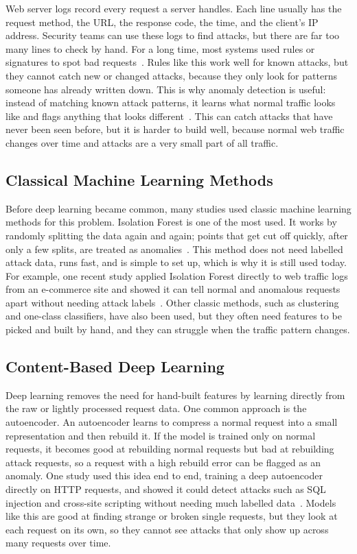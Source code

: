 \documentclass[futureinternet,article,accept,moreauthors]{Definitions/mdpi}
\begin{document}
Web server logs record every request a server handles. Each line usually has the request method, the URL, the response code, the time, and the client's IP address. Security teams can use these logs to find attacks, but there are far too many lines to check by hand. For a long time, most systems used rules or signatures to spot bad requests~\cite{scarfone2007}. Rules like this work well for known attacks, but they cannot catch new or changed attacks, because they only look for patterns someone has already written down. This is why anomaly detection is useful: instead of matching known attack patterns, it learns what normal traffic looks like and flags anything that looks different~\cite{chandola2009}. This can catch attacks that have never been seen before, but it is harder to build well, because normal web traffic changes over time and attacks are a very small part of all traffic.

\subsection{Classical Machine Learning Methods}

Before deep learning became common, many studies used classic machine learning methods for this problem. Isolation Forest is one of the most used. It works by randomly splitting the data again and again; points that get cut off quickly, after only a few splits, are treated as anomalies~\cite{liu2008}. This method does not need labelled attack data, runs fast, and is simple to set up, which is why it is still used today. For example, one recent study applied Isolation Forest directly to web traffic logs from an e-commerce site and showed it can tell normal and anomalous requests apart without needing attack labels~\cite{chua2024}. Other classic methods, such as clustering and one-class classifiers, have also been used, but they often need features to be picked and built by hand, and they can struggle when the traffic pattern changes.

\subsection{Content-Based Deep Learning}

Deep learning removes the need for hand-built features by learning directly from the raw or lightly processed request data. One common approach is the autoencoder. An autoencoder learns to compress a normal request into a small representation and then rebuild it. If the model is trained only on normal requests, it becomes good at rebuilding normal requests but bad at rebuilding attack requests, so a request with a high rebuild error can be flagged as an anomaly. One study used this idea end to end, training a deep autoencoder directly on HTTP requests, and showed it could detect attacks such as SQL injection and cross-site scripting without needing much labelled data~\cite{pan2019}. Models like this are good at finding strange or broken single requests, but they look at each request on its own, so they cannot see attacks that only show up across many requests over time.
\end{document}
